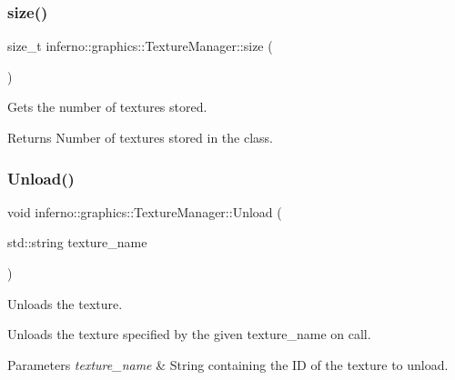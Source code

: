 \subsubsection{\texorpdfstring{size()}{size()}}
{\footnotesize\ttfamily size\+\_\+t inferno\+::graphics\+::\+Texture\+Manager\+::size (\begin{DoxyParamCaption}{ }\end{DoxyParamCaption})\hspace{0.3cm}{\ttfamily [inline]}}



Gets the number of textures stored. 

\begin{DoxyReturn}{Returns}
Number of textures stored in the class. 
\end{DoxyReturn}
\mbox{\label{classinferno_1_1graphics_1_1_texture_manager_af860bd092645a0c99afa35d3e978f3d8}} 
\subsubsection{\texorpdfstring{Unload()}{Unload()}}
{\footnotesize\ttfamily void inferno\+::graphics\+::\+Texture\+Manager\+::\+Unload (\begin{DoxyParamCaption}\item[{std\+::string}]{texture\+\_\+name }\end{DoxyParamCaption})}



Unloads the texture. 

Unloads the texture specified by the given texture\+\_\+name on call. 
\begin{DoxyParams}{Parameters}
{\em texture\+\_\+name} & String containing the ID of the texture to unload. \\
\hline
\end{DoxyParams}
\mbox{\label{classinferno_1_1graphics_1_1_texture_manager_ab3f3fbf66a7c133ed129e1433b1c7cee}} 
